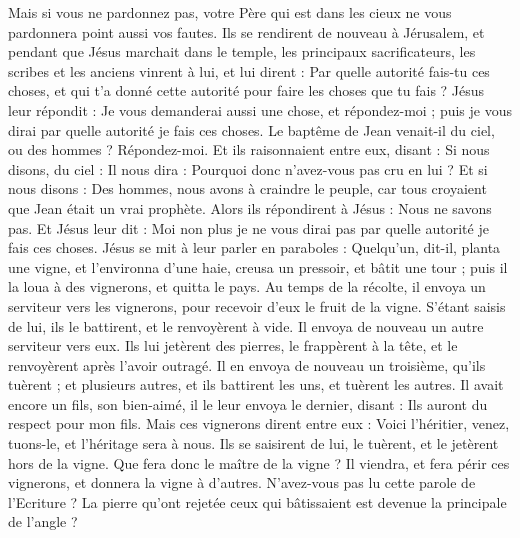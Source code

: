 \begin{multicols}{2}
Mais si vous ne pardonnez pas, votre Père qui est dans les cieux ne vous pardonnera point aussi vos fautes.
Ils se rendirent de nouveau à Jérusalem, et pendant que Jésus marchait dans le temple, les principaux sacrificateurs, les scribes et les anciens vinrent à lui,
et lui dirent : Par quelle autorité fais-tu ces choses, et qui t'a donné cette autorité pour faire les choses que tu fais ?
Jésus leur répondit : Je vous demanderai aussi une chose, et répondez-moi ; puis je vous dirai par quelle autorité je fais ces choses.
Le baptême de Jean venait-il du ciel, ou des hommes ? Répondez-moi.
Et ils raisonnaient entre eux, disant : Si nous disons, du ciel : Il nous dira : Pourquoi donc n’avez-vous pas cru en lui ?
Et si nous disons : Des hommes, nous avons à craindre le peuple, car tous croyaient que Jean était un vrai prophète.
Alors ils répondirent à Jésus : Nous ne savons pas. Et Jésus leur dit : Moi non plus je ne vous dirai pas par quelle autorité je fais ces choses.
\VerseOne{}Jésus se mit à leur parler en paraboles : Quelqu'un, dit-il, planta une vigne, et l'environna d'une haie, creusa un pressoir, et bâtit une tour ; puis il la loua à des vignerons, et quitta le pays.
Au temps de la récolte, il envoya un serviteur vers les vignerons, pour recevoir d'eux le fruit de la vigne.
S’étant saisis de lui, ils le battirent, et le renvoyèrent à vide.
Il envoya de nouveau un autre serviteur vers eux. Ils lui jetèrent des pierres, le frappèrent à la tête, et le renvoyèrent après l'avoir outragé.
Il en envoya de nouveau un troisième, qu’ils tuèrent ; et plusieurs autres, et ils battirent les uns, et tuèrent les autres.
Il avait encore un fils, son bien-aimé, il le leur envoya le dernier, disant : Ils auront du respect pour mon fils.
Mais ces vignerons dirent entre eux : Voici l'héritier, venez, tuons-le, et l'héritage sera à nous.
Ils se saisirent de lui, le tuèrent, et le jetèrent hors de la vigne.
Que fera donc le maître de la vigne ? Il viendra, et fera périr ces vignerons, et donnera la vigne à d'autres.
N'avez-vous pas lu cette parole de l’Ecriture ? La pierre qu’ont rejetée ceux qui bâtissaient est devenue la principale de l’angle{} ?

\end{multicols}
